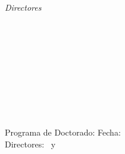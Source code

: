 \begin{titlepage}
	\textit{Directores} \\
		{\large \thesisFirstSupervisor} \\
	  	{\small \thesisFirstReviewerDepartment} \\
		{\small \thesisFirstReviewerUniversity} \\[5mm]
	    {\large \thesisSecondSupervisor} \\
	  	{\small \thesisSecondReviewerDepartment} \\
		{\small \thesisSecondReviewerUniversity} \\[5mm]
	\thesisDate \\

\end{titlepage}


\hfill
\vfill
{
	\small
	\textbf{\thesisName} \\
	\textit{\thesisTitle} \\
	Programa de Doctorado: \thesisSubject
	Fecha: \thesisDate \\
	Directores: \thesisFirstSupervisor\ y \thesisSecondSupervisor \\[1.5em]
}
